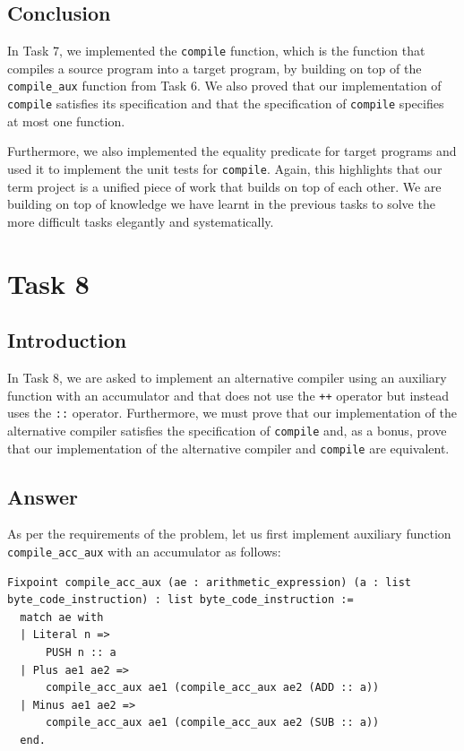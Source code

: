 \documentclass{article}
\begin{document}
\subsection{Conclusion}

In Task 7, we implemented the \texttt{compile} function, which is the function that compiles a source program into a target program, by building on top of the \texttt{compile\_aux} function from Task 6. We also proved that our implementation of \texttt{compile} satisfies its specification and that the specification of \texttt{compile} specifies at most one function.

Furthermore, we also implemented the equality predicate for target programs and used it to implement the unit tests for \texttt{compile}. Again, this highlights that our term project is a unified piece of work that builds on top of each other. We are building on top of knowledge we have learnt in the previous tasks to solve the more difficult tasks elegantly and systematically.

\section{Task 8}

\subsection{Introduction}

In Task 8, we are asked to implement an alternative compiler using an auxiliary function with an accumulator and that does not use the \texttt{++} operator but instead uses the \texttt{::} operator. Furthermore, we must prove that our implementation of the alternative compiler satisfies the specification of \texttt{compile} and, as a bonus, prove that our implementation of the alternative compiler and \texttt{compile} are equivalent.

\subsection{Answer}

As per the requirements of the problem, let us first implement auxiliary function \texttt{compile\_acc\_aux} with an accumulator as follows:

\begin{lstlisting}
Fixpoint compile_acc_aux (ae : arithmetic_expression) (a : list byte_code_instruction) : list byte_code_instruction :=
  match ae with
  | Literal n =>
      PUSH n :: a
  | Plus ae1 ae2 =>
      compile_acc_aux ae1 (compile_acc_aux ae2 (ADD :: a))
  | Minus ae1 ae2 =>
      compile_acc_aux ae1 (compile_acc_aux ae2 (SUB :: a))
  end.
\end{lstlisting}
\end{document}
